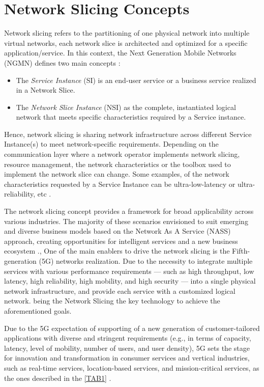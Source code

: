 \documentclass[journal,article,submit,moreauthors,pdftex]{Definitions/mdpi}
\begin{document}
\section{Network Slicing Concepts}
\label{sec:slicing}

Network slicing refers to the partitioning of one physical network into multiple virtual networks, each network slice is architected and optimized for a specific application/service.  In this context, the Next Generation Mobile Networks (NGMN) defines two main concepts \cite{alliance2016description}: 
\begin{itemize}
    \item The \textit{Service Instance} (SI) is an end-user service or a business service realized in a Network Slice.
    \item The \textit{Network Slice Instance} (NSI) as the complete, instantiated logical network that meets specific characteristics required by a Service instance.
\end{itemize}

Hence, network slicing is sharing network infrastructure across different Service Instance(s) to meet network-specific requirements. Depending on the communication layer where a network operator implements network slicing, resource management, the network characteristics or the toolbox used to implement the network slice can change. Some examples, of the network characteristics requested by a Service Instance can be ultra-low-latency or ultra-reliability, etc \cite{alliance2016description}. 

The network slicing concept provides a framework for broad applicability across various industries. The majority of these scenarios envisioned to suit emerging and diverse business models based on the Network As A Service (NASS) approach, creating opportunities for intelligent services and a new business ecosystem \cite{kuklinski2019business,zhang2017network,khan2020network}., One of the main enablers to drive the network slicing is the Fifth-generation (5G) networks realization. Due to the necessity to integrate multiple services with various performance requirements — such as high throughput, low latency, high reliability, high mobility, and high security — into a single physical network infrastructure, and provide each service with
a customized logical network. being the Network Slicing the key technology to achieve the aforementioned goals. 

Due to the 5G expectation of supporting of a new generation of customer-tailored applications with diverse and stringent requirements (e.g., in terms of capacity, latency, level of mobility, number of users, and user density), 5G sets the stage for innovation and transformation in consumer services and vertical industries, such as real-time services, location-based services, and mission-critical services, as the ones described in the \cref{TAB1} \cite{foukas2017network}.
\end{document}

